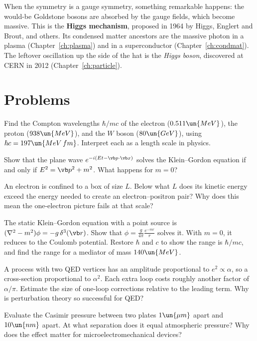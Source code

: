 When the symmetry is a gauge symmetry, something remarkable happens: the would-be Goldstone bosons are absorbed by the gauge fields, which become massive. This is the \textbf{Higgs mechanism}, proposed in 1964 by Higgs, Englert and Brout, and others. Its condensed matter ancestors are the massive photon in a plasma (Chapter~\ref{ch:plasma}) and in a superconductor (Chapter~\ref{ch:condmat}). The leftover oscillation up the side of the hat is the \emph{Higgs boson}, discovered at CERN in 2012 (Chapter~\ref{ch:particle}).

\section{Problems}

\begin{problems}
\core Find the Compton wavelengths $\hbar/mc$ of the electron ($0.511\un{MeV}$), the proton ($938\un{MeV}$), and the $W$ boson ($80\un{GeV}$), using $\hbar c = 197\un{MeV\,fm}$. Interpret each as a length scale in physics.

 Show that the plane wave $e^{-i(Et - \vb p\cdot\vb x)}$ solves the Klein--Gordon equation if and only if $E^2 = \vb p^2 + m^2$. What happens for $m = 0$?

 An electron is confined to a box of size $L$. Below what $L$ does its kinetic energy exceed the energy needed to create an electron--positron pair? Why does this mean the one-electron picture fails at that scale?

\core \label{prob:yukawa} The static Klein--Gordon equation with a point source is $(\nabla^2 - m^2)\phi = -g\,\delta^3(\vb r)$. Show that $\phi = \frac{g}{4\pi}\frac{e^{-mr}}{r}$ solves it. With $m = 0$, it reduces to the Coulomb potential. Restore $\hbar$ and $c$ to show the range is $\hbar/mc$, and find the range for a mediator of mass $140\un{MeV}$.

 A process with two QED vertices has an amplitude proportional to $e^2\propto\alpha$, so a cross-section proportional to $\alpha^2$. Each extra loop costs roughly another factor of $\alpha/\pi$. Estimate the size of one-loop corrections relative to the leading term. Why is perturbation theory so successful for QED?

\core Evaluate the Casimir pressure between two plates $1\un{\mu m}$ apart and $10\un{nm}$ apart. At what separation does it equal atmospheric pressure? Why does the effect matter for microelectromechanical devices?


\end{problems}
